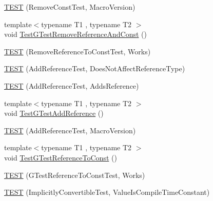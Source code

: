 \begin{DoxyCompactItemize}
\item 
\mbox{\hyperlink{_obj__test_2lib_2googletest-release-1_88_81_2googletest_2test_2gtest__unittest_8cc_a9fd89b0957e416c98f52e2c44196bb29}{T\+E\+ST}} (Remove\+Const\+Test, Macro\+Version)
\item 
{\footnotesize template$<$typename T1 , typename T2 $>$ }\\void \mbox{\hyperlink{_obj__test_2lib_2googletest-release-1_88_81_2googletest_2test_2gtest__unittest_8cc_af4e9d28ffb149f2bce37f0883cece0ba}{Test\+G\+Test\+Remove\+Reference\+And\+Const}} ()
\item 
\mbox{\hyperlink{_obj__test_2lib_2googletest-release-1_88_81_2googletest_2test_2gtest__unittest_8cc_af57c5701311c2e9074540ee680e3f34e}{T\+E\+ST}} (Remove\+Reference\+To\+Const\+Test, Works)
\item 
\mbox{\hyperlink{_obj__test_2lib_2googletest-release-1_88_81_2googletest_2test_2gtest__unittest_8cc_ac910b493f212cc393ec0a34310fd6072}{T\+E\+ST}} (Add\+Reference\+Test, Does\+Not\+Affect\+Reference\+Type)
\item 
\mbox{\hyperlink{_obj__test_2lib_2googletest-release-1_88_81_2googletest_2test_2gtest__unittest_8cc_a79f243d73454356cbce420cb627f2a51}{T\+E\+ST}} (Add\+Reference\+Test, Adds\+Reference)
\item 
{\footnotesize template$<$typename T1 , typename T2 $>$ }\\void \mbox{\hyperlink{_obj__test_2lib_2googletest-release-1_88_81_2googletest_2test_2gtest__unittest_8cc_a9c06f3b08ad59c7dff62b7680a307ed1}{Test\+G\+Test\+Add\+Reference}} ()
\item 
\mbox{\hyperlink{_obj__test_2lib_2googletest-release-1_88_81_2googletest_2test_2gtest__unittest_8cc_a62b3c6edec9e43200fe9cce9a520f90e}{T\+E\+ST}} (Add\+Reference\+Test, Macro\+Version)
\item 
{\footnotesize template$<$typename T1 , typename T2 $>$ }\\void \mbox{\hyperlink{_obj__test_2lib_2googletest-release-1_88_81_2googletest_2test_2gtest__unittest_8cc_a033ae0af50f62e72a31bf1a28151bd65}{Test\+G\+Test\+Reference\+To\+Const}} ()
\item 
\mbox{\hyperlink{_obj__test_2lib_2googletest-release-1_88_81_2googletest_2test_2gtest__unittest_8cc_a69fa334ed4d6f74b62d2404b65ae7852}{T\+E\+ST}} (G\+Test\+Reference\+To\+Const\+Test, Works)
\item 
\mbox{\hyperlink{_obj__test_2lib_2googletest-release-1_88_81_2googletest_2test_2gtest__unittest_8cc_a1e038e35137c6cb94a3fc876aa6d9c57}{T\+E\+ST}} (Implicitly\+Convertible\+Test, Value\+Is\+Compile\+Time\+Constant)

\end{DoxyCompactItemize}
